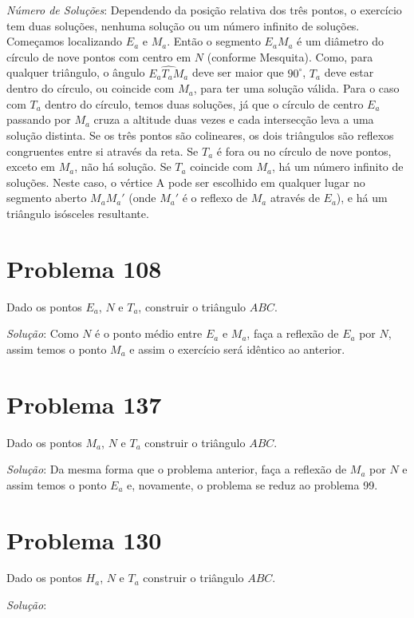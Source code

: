 \documentclass[12pt, openright, a4paper, brazil, openany, oneside]{abntex2}
\begin{document}
\textit{Número de Soluções}: Dependendo da posição relativa dos três pontos, o exercício tem duas soluções, nenhuma solução ou um número infinito de soluções. Começamos localizando $E_{a}$ e $M_{a}$. Então o segmento $E_{a}M_{a}$ é um diâmetro do círculo de nove pontos com centro em $N$ (conforme Mesquita\cite{mesquita2013}). Como, para qualquer triângulo, o ângulo $\hat{E_{a}T_{a}M_{a}}$ deve ser maior que $90^\circ$, $T_a$ deve estar dentro do círculo, ou coincide com $M_a$, para ter uma solução válida. Para o caso com $T_a$ dentro do círculo, temos duas soluções, já que o círculo de centro $E_{a}$ passando por $M_a$ cruza a altitude duas vezes e cada intersecção leva a uma solução distinta. Se os três pontos são colineares, os dois triângulos são reflexos congruentes entre si através da reta. Se $T_a$ é fora ou no círculo de nove pontos, exceto em $M_a$, não há solução. Se $T_a$ coincide com $M_a$, há um número infinito de soluções. Neste caso, o vértice A pode ser escolhido em qualquer lugar no segmento aberto $M_{a}M_{a}'$ (onde $M_{a}'$ é o reflexo de $M_{a}$ através de $E_a$), e há um triângulo isósceles resultante.

\section{Problema 108}

Dado os pontos $E_a$, $N$ e $T_a$, construir o triângulo $ABC$.

\textit{Solução}: Como $N$ é o ponto médio entre $E_a$ e $M_a$, faça a reflexão de $E_a$ por $N$, assim temos o ponto $M_a$ e assim o exercício será idêntico ao anterior.

\section{Problema 137}

Dado os pontos $M_a$, $N$ e $T_a$ construir o triângulo $ABC$.

\textit{Solução}: Da mesma forma que o problema anterior, faça a reflexão de $M_a$ por $N$ e assim temos o ponto $E_a$ e, novamente, o problema se reduz ao problema 99.

\section{Problema 130}

Dado os pontos $H_a$, $N$ e $T_a$ construir o triângulo $ABC$.

\textit{Solução}: 


\end{document}
